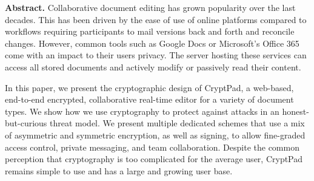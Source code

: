 {\small
  \noindent
  \textbf{Abstract.}
  Collaborative document editing has grown popularity over the last decades.
  This has been driven by the ease of use of online platforms compared to workflows requiring participants to mail versions back and forth and reconcile changes.
  However, common tools such as Google Docs or Microsoft's Office 365 come with an impact to their users privacy.
  The server hosting these services can access all stored documents and actively modify or passively read their content.

  In this paper, we present the cryptographic design of CryptPad, a web-based, end-to-end encrypted, collaborative real-time editor for a variety of document types.
  We show how we use cryptography to protect against attacks in an honest-but-curious threat model.
  We present multiple dedicated schemes that use a mix of asymmetric and symmetric encryption, as well as signing, to allow fine-graded access control, private messaging, and team collaboration.
  Despite the common perception that cryptography is too complicated for the average user, CryptPad remains simple to use and has a large and growing user base.
}
